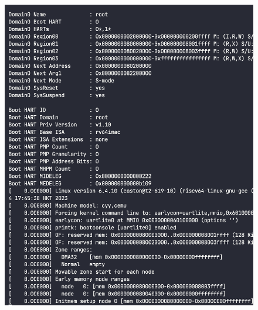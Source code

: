 \begin{frame}
\begin{columns}
\begin{column}{.6\linewidth}
            \begin{figure}
                \centering
                \includegraphics[height=0.7\textheight]{assets/cemu2.png}
            \end{figure}
        \end{column}
    \end{columns}


\end{frame}